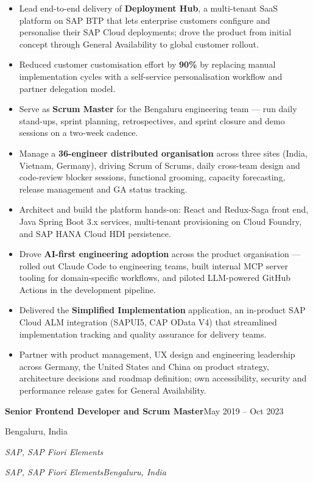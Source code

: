 \documentclass[11pt,a4paper]{article}
\makeatletter
\newcommand{\role}[2]{{\parfillskip=0pt\relax\noindent\textbf{#1}\hfill #2\par}}
\newcommand{\org}[2]{%
  \def\@tmp{#2}%
  \ifx\@tmp\@empty
    {\noindent\textit{#1}\par}%
  \else
    {\parfillskip=0pt\relax\noindent\textit{#1}\hfill\textit{#2}\par}%
  \fi
  \vspace{2pt}}
\makeatother
\begin{document}
\begin{itemize}
  \item Lead end-to-end delivery of \textbf{Deployment Hub}, a multi-tenant SaaS platform on SAP BTP
        that lets enterprise customers configure and personalise their SAP Cloud deployments; drove
        the product from initial concept through General Availability to global customer rollout.
  \item Reduced customer customisation effort by \textbf{90\%} by replacing manual implementation
        cycles with a self-service personalisation workflow and partner delegation model.
  \item Serve as \textbf{Scrum Master} for the Bengaluru engineering team --- run daily stand-ups,
        sprint planning, retrospectives, and sprint closure and demo sessions on a two-week cadence.
  \item Manage a \textbf{36-engineer distributed organisation} across three sites (India, Vietnam,
        Germany), driving Scrum of Scrums, daily cross-team design and code-review
        blocker sessions, functional grooming, capacity forecasting, release management and GA
        status tracking.
  \item Architect and build the platform hands-on: React and Redux-Saga front end, Java Spring Boot
        3.x services, multi-tenant provisioning on Cloud Foundry, and SAP HANA Cloud HDI persistence.
  \item Drove \textbf{AI-first engineering adoption} across the product organisation --- rolled out
        Claude Code to engineering teams, built internal MCP server tooling for domain-specific
        workflows, and piloted LLM-powered GitHub Actions in the development pipeline.
  \item Delivered the \textbf{Simplified Implementation} application, an in-product SAP Cloud ALM
        integration (SAPUI5, CAP OData V4) that streamlined implementation tracking and quality
        assurance for delivery teams.
  \item Partner with product management, UX design and engineering leadership across Germany, the
        United States and China on product strategy, architecture decisions and roadmap definition;
        own accessibility, security and performance release gates for General Availability.
\end{itemize}

\role{Senior Frontend Developer and Scrum Master}{May 2019 -- Oct 2023}
\org{SAP, SAP Fiori Elements}{Bengaluru, India}
\end{document}
